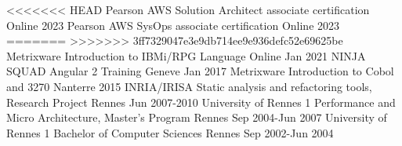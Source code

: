 
\begin{cventries}
\cventry
<<<<<<< HEAD
{Pearson} %
{AWS Solution Architect associate certification} %
{Online} %
{2023} %
{
}
\cventry
{Pearson} %
{AWS SysOps associate certification} %
{Online} %
{2023} %
{
}
\cventry
=======
>>>>>>> 3ff7329047e3e9db714ee9e936defc52e69625be
{Metrixware} %
{Introduction to IBMi/RPG Language} %
{Online} %
{Jan 2021} %
{
}
\cventry
{NINJA SQUAD} %
{Angular 2 Training} %
{Geneve} %
{Jan 2017} %
{
}
\cventry
{Metrixware} %
{Introduction to Cobol and 3270} %
{Nanterre} %
{2015} %
{
}
\cventry
{INRIA/IRISA} %
{Static analysis and refactoring tools, Research Project} %
{Rennes} %
{Jun 2007-2010} %
{
}
\cventry
{University of Rennes 1} %
{Performance and Micro Architecture, Master's Program} %
{Rennes} %
{Sep 2004-Jun 2007} %
{
}
\cventry
{University of Rennes 1} %
{Bachelor of Computer Sciences} %
{Rennes} %
{Sep 2002-Jun 2004} %
{
}
\end{cventries}